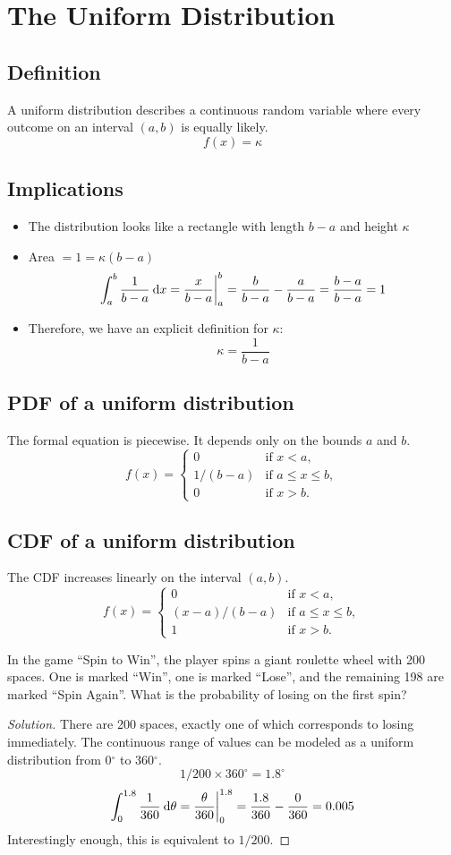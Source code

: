 \documentclass[11pt,leqno,letterpaper]{article}
\begin{document}
\section{The Uniform Distribution}
\subsection{Definition}
A uniform distribution describes a continuous random variable
where every outcome on an interval $(a,b)$ is equally likely.
\[
f(x) = \kappa
\]
\subsection{Implications}
\begin{itemize}
\item The distribution looks like a rectangle
with length $b-a$ and height $\kappa$
\item Area $= 1 = \kappa (b-a)$
\[
\int_a^b \frac{1}{b-a} \:\mathrm{d}x = \frac{x}{b-a}\bigg|_a^b
= \frac{b}{b-a} - \frac{a}{b-a} = \frac{b-a}{b-a} = 1
\]
\item Therefore, we have an explicit definition for $\kappa$:
\[
\kappa = \frac{1}{b-a}
\]
\end{itemize}
\subsection{PDF of a uniform distribution}
The formal equation is piecewise.
It depends only on the bounds $a$ and $b$.
\[
f(x)=
\begin{cases}
0 & \text{if } x < a,\\
1/(b-a) & \text{if } a \leq x \leq b,\\
0 & \text{if } x > b.
\end{cases}
\]
\subsection{CDF of a uniform distribution}
The CDF increases linearly on the interval $(a,b)$.
\[
f(x)=
\begin{cases}
0 & \text{if } x < a,\\
(x-a)/(b-a) & \text{if } a \leq x \leq b,\\
1 & \text{if } x > b.
\end{cases}
\]
\psep
\begin{problem}
In the game ``Spin to Win'', the player spins a giant roulette wheel
with 200 spaces. One is marked ``Win'', one is marked ``Lose'',
and the remaining 198 are marked ``Spin Again''.
What is the probability of losing on the first spin?
\begin{proof}[Solution]
There are 200 spaces,
exactly one of which corresponds to losing immediately.
The continuous range of values can be modeled as
a uniform distribution from 0$^\circ$ to 360$^\circ$.
\[
1/200 \times 360^\circ = 1.8^\circ
\]
\[
\int_0^{1.8} \frac{1}{360} \:\mathrm{d}\theta
= \frac{\theta}{360} \bigg|_0^{1.8} 
= \frac{1.8}{360} - \frac{0}{360} = 0.005
\]
Interestingly enough, this is equivalent to $1/200$.
\end{proof}
\end{problem}
\psep
\end{document}
